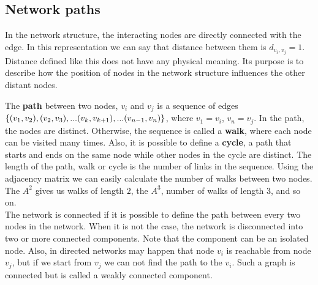 

\subsection{Network paths}
In the network structure, the interacting nodes are directly connected with the edge. In this representation we can say that distance between them is $d_{v_i, v_j}=1$. Distance defined like this does not have any physical meaning. Its purpose is to describe how the position of nodes in the network structure influences the other distant nodes. 

The \textbf{path} between two nodes, $v_i$ and $v_j$ is a sequence of edges $\{(v_1, v_2),  (v_2, v_3), ...(v_k, v_{k+1})\\,... (v_{n-1}, v_n)\}$, where $v_1=v_i$, $v_n=v_j$. In the path, the nodes are distinct. Otherwise, the sequence is called a \textbf{walk}, where each node can be visited many times. Also, it is possible to define a \textbf{cycle}, a path that starts and ends on the same node while other nodes in the cycle are distinct. The length of the path, walk or cycle is the number of links in the sequence. Using the adjacency matrix we can easily calculate the number of walks between two nodes. The $A^2$ gives us walks of length $2$, the $A^3$, number of walks of length 3, and so on. \\

The network is connected if it is possible to define the path between every two nodes in the network. When it is not the case, the network is disconnected into two or more connected components. Note that the component can be an isolated node. Also, in directed networks may happen that node $v_i$ is reachable from node $v_j$, but if we start from $v_j$ we can not find the path to the $v_i$. Such a graph is connected but is called a weakly connected component. \\

